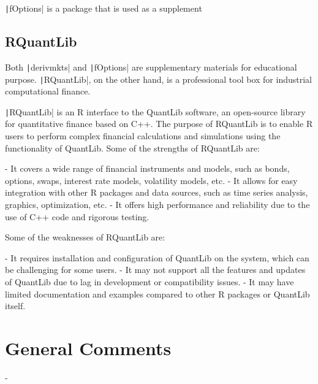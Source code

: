 \texttt|fOptions| is a package that is used as a supplement

\subsection{RQuantLib} \label{sub:RQuantLib}

Both \texttt|derivmkts| and \texttt|fOptions| are supplementary materials for educational purpose. \texttt|RQuantLib|, on the other hand, is a professional tool box for industrial computational finance.

\texttt|RQuantLib| is an R interface to the QuantLib software, an open-source library for quantitative finance based on C++. The purpose of RQuantLib is to enable R users to perform complex financial calculations and simulations using the functionality of QuantLib. Some of the strengths of RQuantLib are:

- It covers a wide range of financial instruments and models, such as bonds, options, swaps, interest rate models, volatility models, etc.
- It allows for easy integration with other R packages and data sources, such as time series analysis, graphics, optimization, etc.
- It offers high performance and reliability due to the use of C++ code and rigorous testing.

Some of the weaknesses of RQuantLib are:

- It requires installation and configuration of QuantLib on the system, which can be challenging for some users.
- It may not support all the features and updates of QuantLib due to lag in development or compatibility issues.
- It may have limited documentation and examples compared to other R packages or QuantLib itself.

\section{General Comments}-

\newpage